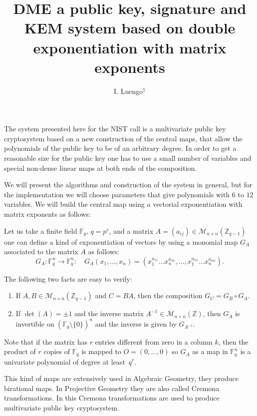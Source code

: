 \documentclass[12pt,a4paper]{amsart}
\title[DME]{DME a  public key, signature and KEM system based on double exponentiation  with matrix exponents}
\author[I. Luengo]{I. Luengo${^1}$}
\date{}
\theoremstyle{remark}
\theoremstyle{definition}
\newcommand\bz{{\mathbb Z}}
\newcommand\gfq{\mathbb{F}_q}
\begin{document}
 

\maketitle

The system presented here for the NIST call is a multivariate public key cryptosystem based on a new construction of the central maps,
that allow the polynomials of the public key to be of an arbitrary degree. In order to get a reasonable size for the public key one has 
to use a small number of variables and special non-dense linear maps at both ends of the composition. 

We will present the algorithms and construction of the system in general, but
for the implementation we will choose parameters that give polynomials with $6$ to $12$ variables. 
We will build the central map using a vectorial exponentiation with matrix exponents as follows:

Let us take a finite field $\gfq$, $q=p^e$, and a matrix $A=(a_{ij})\in \mathscr{M}_{n\times n}(\bz_{q-1})$ 
one can define a kind of exponentiation of vectors by using a monomial map $G_A$ associated to the matrix $A$ as follows:
\begin{equation}\label{eq1}
 G_A: \gfq^n \to \gfq^n: \quad G_A(x_1,\ldots, x_n)=(x_1^{a_{11}}\dots   x_n^{a_{1n}}, \ldots, x_1^{a_{n1}}\dots  x_n^{a_{nn}}).  
\end{equation}

The following two facts are easy to verify:
\begin{enumerate}[label=\alph*)]
\item If $A,B\in \mathscr{M}_{n\times n}(\bz_{q-1})$ and $C=B A$, then the composition $G_C=G_B \circ G_A$.
\item If $ \det(A) =\pm 1$ and the inverse matrix $A^{-1}\in \mathscr{M}_{n\times n}(\bz)$, then $G_{A}$
is invertible on $(\gfq\setminus \{0\})^n$ and the inverse is given by $G_{A^{-1}}$.
\end{enumerate}

Note that if the matrix has $r$ entries different from zero in a column $k$, then the product 
of $r$ copies of $\gfq$ is mapped to $O=(0,\ldots, 0)$ so $G_A$ as a map in $\gfq^n$ 
is a univariate polynomial of degree at least~$q^r$.

This kind of maps are extensively used in Algebraic Geometry,
they produce birational maps. In Projective Geometry they are  also called Cremona transformations. 
In \cite{D} this Cremona  transformations are used to produce multivariate public key cryptosystem.
\end{document}
